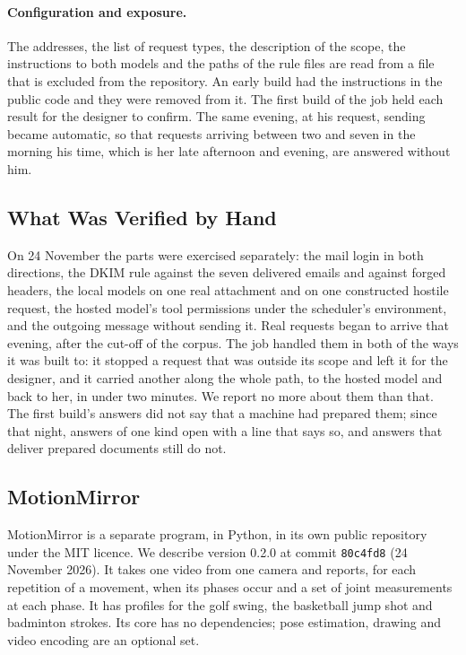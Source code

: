 \documentclass[sigconf,nonacm]{acmart}
\newcommand{\code}[1]{\textnormal{\texttt{\small #1}}}
\begin{document}
\paragraph{Configuration and exposure.}
The addresses, the list of request types, the description of the scope, the instructions to
both models and the paths of the rule files are read from a file that is excluded from the
repository. An early build had the instructions in the public code and they were removed from
it. The first build of the job held each result for the designer to confirm. The same evening,
at his request, sending became automatic, so that requests arriving between two and seven in
the morning his time, which is her late afternoon and evening, are answered without him.

\subsection{What Was Verified by Hand}\label{sec:verify}
On 24 November the parts were exercised separately: the mail login in both directions, the DKIM
rule against the seven delivered emails and against forged headers, the local models on one real
attachment and on one constructed hostile request, the hosted model's tool permissions under the
scheduler's environment, and the outgoing message without sending it. Real requests began to arrive that evening, after the cut-off of the corpus. The job handled
them in both of the ways it was built to: it stopped a request that was outside its scope and
left it for the designer, and it carried another along the whole path, to the hosted model and
back to her, in under two minutes. We report no more about them than that. The first build's
answers did not say that a machine had prepared them; since that night, answers of one kind
open with a line that says so, and answers that deliver prepared documents still do not.

\subsection{MotionMirror}\label{sec:mm}
MotionMirror is a separate program, in Python, in its own public repository under the MIT
licence. We describe version 0.2.0 at commit \code{80c4fd8} (24 November 2026). It takes one
video from one camera and reports, for each repetition of a movement, when its phases occur
and a set of joint measurements at each phase. It has profiles for the golf swing, the
basketball jump shot and badminton strokes. Its core has no dependencies; pose estimation,
drawing and video encoding are an optional set.
\end{document}
